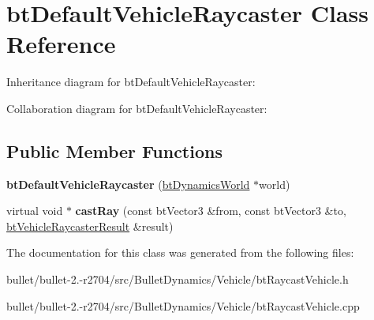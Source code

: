 \hypertarget{classbt_default_vehicle_raycaster}{\section{bt\+Default\+Vehicle\+Raycaster Class Reference}
\label{classbt_default_vehicle_raycaster}
}


Inheritance diagram for bt\+Default\+Vehicle\+Raycaster\+:


Collaboration diagram for bt\+Default\+Vehicle\+Raycaster\+:
\subsection*{Public Member Functions}
\begin{DoxyCompactItemize}
\item 
\hypertarget{classbt_default_vehicle_raycaster_ab8cc4f6d341d04452cdff35e4fb2198d}{{\bfseries bt\+Default\+Vehicle\+Raycaster} (\hyperlink{classbt_dynamics_world}{bt\+Dynamics\+World} $\ast$world)}\label{classbt_default_vehicle_raycaster_ab8cc4f6d341d04452cdff35e4fb2198d}

\item 
\hypertarget{classbt_default_vehicle_raycaster_a0d52996ccf166b42590e698dd30d43c1}{virtual void $\ast$ {\bfseries cast\+Ray} (const bt\+Vector3 \&from, const bt\+Vector3 \&to, \hyperlink{structbt_vehicle_raycaster_1_1bt_vehicle_raycaster_result}{bt\+Vehicle\+Raycaster\+Result} \&result)}\label{classbt_default_vehicle_raycaster_a0d52996ccf166b42590e698dd30d43c1}

\end{DoxyCompactItemize}


The documentation for this class was generated from the following files\+:\begin{DoxyCompactItemize}
\item 
bullet/bullet-\/2.-\/r2704/src/\+Bullet\+Dynamics/\+Vehicle/bt\+Raycast\+Vehicle.\+h\item 
bullet/bullet-\/2.-\/r2704/src/\+Bullet\+Dynamics/\+Vehicle/bt\+Raycast\+Vehicle.\+cpp\end{DoxyCompactItemize}
